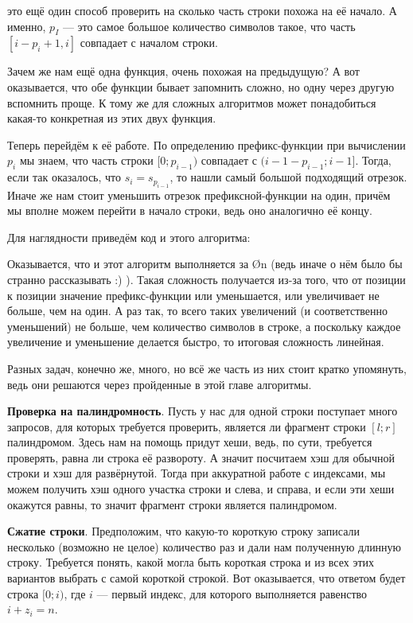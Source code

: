 

 это ещё один способ проверить на сколько часть строки похожа на её начало. А именно, $p_I$ — это самое большое количество символов такое, что часть $[i - p_i + 1, i]$ совпадает с началом строки.

Зачем же нам ещё одна функция, очень похожая на предыдущую? А вот оказывается, что обе функции бывает запомнить сложно, но одну через другую вспомнить проще. К тому же для сложных алгоритмов может понадобиться какая-то конкретная из этих двух функция.

Теперь перейдём к её работе. По определению префикс-функции при вычислении $p_i$ мы знаем, что часть строки $[0; p_{i - 1})$ совпадает с $(i - 1 - p_{i - 1}; i - 1]$. Тогда, если так оказалось, что $s_i = s_{p_{i - 1}}$, то нашли самый большой подходящий отрезок. Иначе же нам стоит уменьшить отрезок префиксной-функции на один, причём мы вполне можем перейти в начало строки, ведь оно аналогично её концу.

Для наглядности приведём код и этого алгоритма:


Оказывается, что и этот алгоритм выполняется за \O{n} (ведь иначе о нём было бы странно рассказывать :) ). Такая сложность получается из-за того, что от позиции к позиции значение префикс-функции или уменьшается, или увеличивает не больше, чем на один. А раз так, то всего таких увеличений (и соответственно уменьшений) не больше, чем количество символов в строке, а поскольку каждое увеличение и уменьшение делается быстро, то итоговая сложность линейная.


Разных задач, конечно же, много, но всё же часть из них стоит кратко упомянуть, ведь они решаются через пройденные в этой главе алгоритмы. 

\textbf{Проверка на палиндромность}. Пусть у нас для одной строки поступает много запросов, для которых требуется проверить, является ли фрагмент строки $[l; r]$ палиндромом. Здесь нам на помощь придут хеши, ведь, по сути, требуется проверять, равна ли строка её развороту. А значит посчитаем хэш для обычной строки и хэш для развёрнутой. Тогда при аккуратной работе с индексами, мы можем получить хэш одного участка строки и слева, и справа, и если эти хеши окажутся равны, то значит фрагмент строки является палиндромом.

\textbf{Сжатие строки}. Предположим, что какую-то короткую строку записали несколько (возможно не целое) количество раз и дали нам полученную длинную строку. Требуется понять, какой могла быть короткая строка и из всех этих вариантов выбрать с самой короткой строкой. Вот оказывается, что ответом будет строка $[0; i)$, где $i$ — первый индекс, для которого выполняется равенство $i + z_i = n$.

